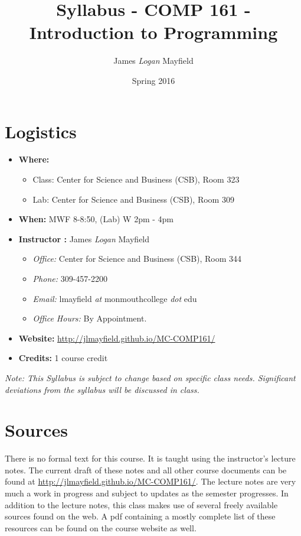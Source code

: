 \documentclass[10pt]{article}
\title{Syllabus - COMP 161 - Introduction to Programming}
\author{ James \textit{Logan} Mayfield }
\date{Spring 2016}
\begin{document}
\maketitle

\section{Logistics}
\begin{itemize}
\item \textbf{Where: } 
\begin{itemize} 
\item Class: Center for Science and Business (CSB), Room 323	
\item Lab: Center for Science and Business (CSB), Room 309
\end{itemize}
\item \textbf{When: } MWF 8-8:50, (Lab) W 2pm - 4pm
\item \textbf{Instructor :} James \textit{Logan} Mayfield
\begin{itemize}
\item \textit{Office: } Center for Science and Business (CSB), Room 344
\item \textit{Phone: } 309-457-2200
\item \textit{Email: } lmayfield \textit{at} monmouthcollege \textit{dot} edu
\item \textit{Office Hours: }  By Appointment.
\end{itemize}
\item \textbf{Website: } \url{http://jlmayfield.github.io/MC-COMP161/}
\item \textbf{Credits: } 1 course credit
\end{itemize}
\emph{Note: This Syllabus is subject to change based on specific class needs. Significant deviations from the syllabus will be discussed in class.}

\section{Sources}

There is no formal text for this course. It is taught using the instructor's lecture notes. The current draft of these notes and all other course documents can be found at \url{http://jlmayfield.github.io/MC-COMP161/}. The lecture notes are very much a work in progress and subject to updates as the semester progresses. In addition to the lecture notes, this class makes use of several freely available sources found on the web. A pdf containing a mostly complete list of these resources can be found on the course website as well.  
\end{document}
